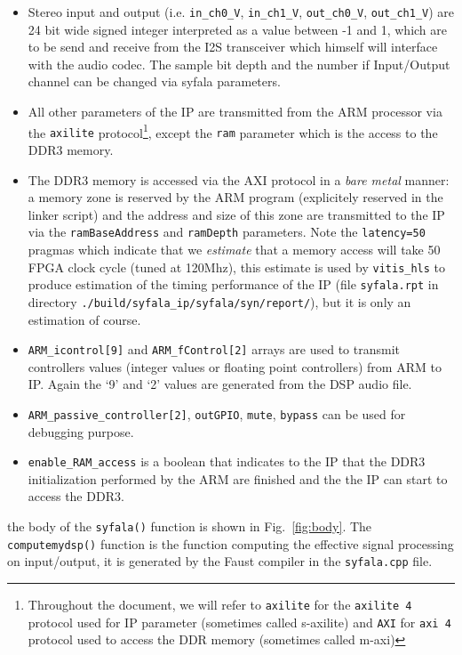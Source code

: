 \documentclass[11pt]{article}
\numberwithin{equation}{section}
\numberwithin{figure}{section}
\begin{document}
\begin{itemize}
\item Stereo input and output  (i.e. \verb#in_ch0_V#, \verb#in_ch1_V#, \verb#out_ch0_V#, \verb#out_ch1_V#) are 24 bit wide signed integer interpreted as a value between -1 and 1, which are to be send and receive from the I2S transceiver which himself will interface with the audio codec. The sample bit depth and the number if Input/Output channel can be changed via syfala parameters.
  \item All other parameters of the IP are transmitted from the ARM processor via the {\tt axilite} protocol\footnote{Throughout the document, we will refer to {\tt axilite} for the {\tt axilite 4} protocol used for IP parameter (sometimes called s-axilite) and {\tt AXI} for {\tt axi 4} protocol used to access the DDR memory (sometimes called m-axi)}, except the {\tt ram} parameter which is the access to the DDR3 memory. 
\item The DDR3 memory is accessed via the AXI protocol in a {\em bare metal} manner: a memory zone is reserved by the ARM program (explicitely reserved in the linker script) and the address and size of this zone are transmitted to the IP via the {\tt ramBaseAddress} and {\tt ramDepth} parameters. Note the {\tt latency=50} pragmas which indicate that we {\em estimate} that a memory access will take 50 FPGA clock cycle (tuned at 120Mhz), this estimate is used by {\tt vitis\_hls} to produce estimation of the timing performance of the IP (file {\tt syfala.rpt} in directory {\tt ./build/syfala\_ip/syfala/syn/report/}), but it is only an estimation of course.
\item {\tt ARM\_icontrol[9]} and {\tt ARM\_fControl[2]} arrays are used to transmit controllers values (integer values or floating point controllers) from ARM to IP. Again the `9' and `2' values are generated from the DSP audio file.
\item  {\tt ARM\_passive\_controller[2]}, {\tt outGPIO}, {\tt mute}, {\tt bypass}  can be used for debugging purpose.
\item {\tt enable\_RAM\_access} is a boolean that indicates to the IP that the DDR3 initialization performed by the ARM are finished and the the IP can start to access the DDR3.
\end{itemize}

the body of the {\tt syfala()} function is shown in Fig.~\ref{fig:body}. The {\tt computemydsp()} function is the function computing the effective signal processing on input/output, it is generated by the Faust compiler in the {\tt syfala.cpp} file.
\end{document}
